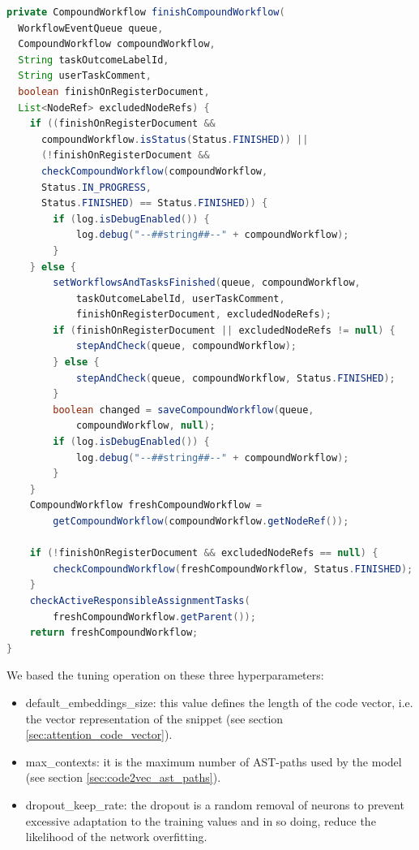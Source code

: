 



\begin{lstlisting}[caption={Code snippet with 199 tokens}, label={lst:snippet199},language=Java]
private CompoundWorkflow finishCompoundWorkflow(
  WorkflowEventQueue queue,
  CompoundWorkflow compoundWorkflow, 
  String taskOutcomeLabelId, 
  String userTaskComment, 
  boolean finishOnRegisterDocument, 
  List<NodeRef> excludedNodeRefs) {
    if ((finishOnRegisterDocument &&
      compoundWorkflow.isStatus(Status.FINISHED)) ||
      (!finishOnRegisterDocument &&
      checkCompoundWorkflow(compoundWorkflow,
      Status.IN_PROGRESS, 
      Status.FINISHED) == Status.FINISHED)) {
        if (log.isDebugEnabled()) {
            log.debug("--##string##--" + compoundWorkflow);
        }
    } else {
        setWorkflowsAndTasksFinished(queue, compoundWorkflow, 
            taskOutcomeLabelId, userTaskComment,
            finishOnRegisterDocument, excludedNodeRefs);
        if (finishOnRegisterDocument || excludedNodeRefs != null) {
            stepAndCheck(queue, compoundWorkflow);
        } else {
            stepAndCheck(queue, compoundWorkflow, Status.FINISHED);
        }
        boolean changed = saveCompoundWorkflow(queue,
            compoundWorkflow, null);
        if (log.isDebugEnabled()) {
            log.debug("--##string##--" + compoundWorkflow);
        }
    }
    CompoundWorkflow freshCompoundWorkflow =
        getCompoundWorkflow(compoundWorkflow.getNodeRef());
        
    if (!finishOnRegisterDocument && excludedNodeRefs == null) {
        checkCompoundWorkflow(freshCompoundWorkflow, Status.FINISHED);
    }
    checkActiveResponsibleAssignmentTasks(
        freshCompoundWorkflow.getParent());
    return freshCompoundWorkflow;
}
\end{lstlisting}

\noindent We based the tuning operation on these three hyperparameters:
\begin{itemize}
    \item default\_embeddings\_size: this value defines the length of the code vector, i.e. the vector representation of the snippet (see section \ref{sec:attention_code_vector}).
    \item max\_contexts: it is the maximum number of AST-paths used by the model (see section \ref{sec:code2vec_ast_paths}).
    \item dropout\_keep\_rate: the dropout is a random removal of neurons to prevent excessive adaptation to the training values and in so doing, reduce the likelihood of the network overfitting.
\end{itemize}

